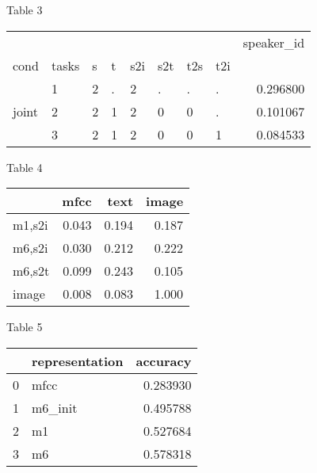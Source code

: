 Table 3 \label{tab:speaker-inv}
\begin{tabular}{llllllllr}
\toprule
      &   &   &   &   &   &   &   &  speaker\_id \\
cond & tasks & s & t & s2i & s2t & t2s & t2i &             \\
\midrule
      & 1 & 2 & . & 2 & . & . & . &    0.296800 \\
joint & 2 & 2 & 1 & 2 & 0 & 0 & . &    0.101067 \\
      & 3 & 2 & 1 & 2 & 0 & 0 & 1 &    0.084533 \\
\bottomrule
\end{tabular}

Table 4 \label{tab:rsa}
\begin{tabular}{lrrr}
\toprule
{} &   mfcc &   text &  image \\
\midrule
m1,s2i &  0.043 &  0.194 &  0.187 \\
m6,s2i &  0.030 &  0.212 &  0.222 \\
m6,s2t &  0.099 &  0.243 &  0.105 \\
image  &  0.008 &  0.083 &  1.000 \\
\bottomrule
\end{tabular}

Table 5 \label{tab:phoneme-decoding}
\begin{tabular}{llr}
\toprule
{} & representation &  accuracy \\
\midrule
0 &           mfcc &  0.283930 \\
1 &        m6\_init &  0.495788 \\
2 &             m1 &  0.527684 \\
3 &             m6 &  0.578318 \\
\bottomrule
\end{tabular}

